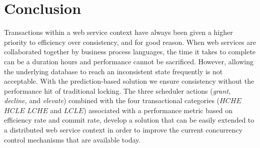 \documentclass[conference]{IEEEtran}
\begin{document}
\section*{Conclusion}
Transactions within a web service context have always been given a higher priority to efficiency over consistency, and for good reason. When web services are collaborated together by business process languages, the time it takes to complete can be a duration hours and performance cannot be sacrificed. However, allowing the underlying database to reach an inconsistent state frequently is not acceptable. With the prediction-based solution we ensure consistency without the performance hit of traditional locking. The three scheduler actions (\textit{grant, decline,} and \textit{elevate}) combined with the four transactional categories ($HCHE$ $HCLE$ $LCHE$ and $LCLE$) associated with a performance metric based on efficiency rate and commit rate, develop a solution that can be easily extended to a distributed web service context in order to improve the current concurrency control mechanisms that are available today.




\ifCLASSOPTIONcaptionsoff
  \newpage
\fi
\end{document}
